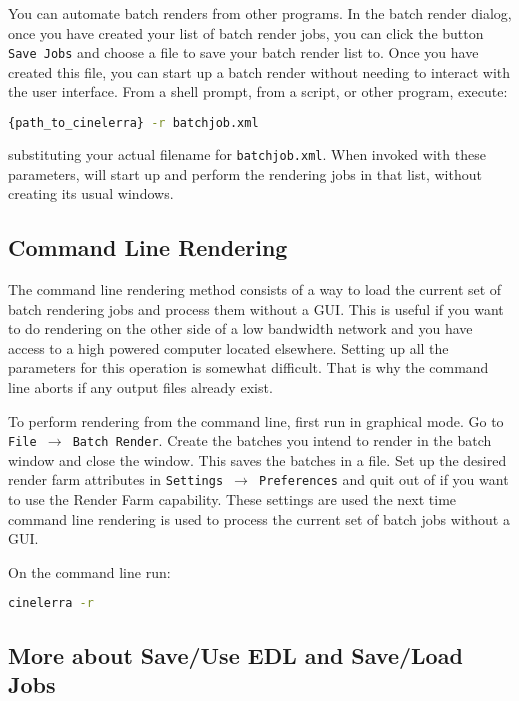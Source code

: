 You can automate \CGG{} batch renders from other programs.  In the batch render dialog, once you have created your list of batch render jobs, you can click the button \texttt{Save Jobs} and choose a file to save your batch render list to.  Once you have created this file, you can start up a batch render without needing to interact with the \CGG{} user interface.  From a shell prompt, from a script, or other program, execute:

\begin{lstlisting}[language=bash,numbers=none]
    {path_to_cinelerra} -r batchjob.xml
\end{lstlisting}
substituting  your actual filename for \texttt{batchjob.xml}.  When invoked with these parameters, \CGG{} will start up and perform the rendering jobs in that list, without creating its usual windows.

\subsection{Command Line Rendering}%
\label{sub:command_line_rendering}

The command line rendering method consists of a way to load the current set of batch rendering jobs and process them without a GUI. This is useful if you want to do rendering on the other side of a low bandwidth network and you have access to a high powered computer located elsewhere. Setting up all the parameters for this operation is somewhat difficult. That is why the command line aborts if any output files already exist.

To perform rendering from the command line, first run \CGG{} in graphical mode. Go to \texttt{File $\rightarrow$ Batch Render}. Create the batches you intend to render in the batch window and close the window. This saves the batches in a file. Set up the desired render farm attributes in \texttt{Settings $\rightarrow$ Preferences} and quit out of \CGG{} if you want to use the Render Farm capability.  These settings are used the next time command line rendering is used to process the current set of batch jobs without a GUI.

On the command line run:

\begin{lstlisting}[language=bash,numbers=none]
cinelerra -r
\end{lstlisting}

\subsection{More about Save/Use EDL and Save/Load Jobs}%
\label{sub:more_save_use_edl_jobs}

